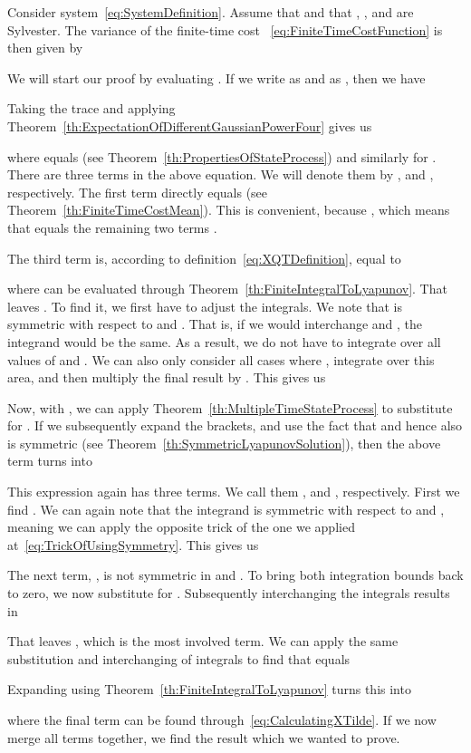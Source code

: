 \documentclass[twocolumn]{autart}
\begin{document}
\begin{thm}\label{th:FiniteTimeCostVariance}
Consider system~\eqref{eq:SystemDefinition}. Assume that  and that , ,  and  are Sylvester. The variance  of the finite-time cost ~\eqref{eq:FiniteTimeCostFunction} is then given by

\end{thm}
\begin{pf}
We will start our proof by evaluating . If we write  as  and  as , then we have

Taking the trace and applying Theorem~\ref{th:ExpectationOfDifferentGaussianPowerFour} gives us

where  equals  (see Theorem~\ref{th:PropertiesOfStateProcess}) and similarly for . There are three terms in the above equation. We will denote them by ,  and , respectively. The first term  directly equals  (see Theorem~\ref{th:FiniteTimeCostMean}). This is convenient, because , which means that  equals the remaining two terms .

The third term  is, according to definition~\eqref{eq:XQTDefinition}, equal to

where  can be evaluated through Theorem~\ref{th:FiniteIntegralToLyapunov}. That leaves . To find it, we first have to adjust the integrals. We note that  is symmetric with respect to  and . That is, if we would interchange  and , the integrand would be the same. As a result, we do not have to integrate over all values of  and . We can also only consider all cases where , integrate over this area, and then multiply the final result by . This gives us

Now, with , we can apply Theorem~\ref{th:MultipleTimeStateProcess} to substitute for . If we subsequently expand the brackets, and use the fact that  and hence also  is symmetric (see Theorem~\ref{th:SymmetricLyapunovSolution}), then the above term turns into

This expression again has three terms. We call them ,  and , respectively. First we find . We can again note that the integrand is symmetric with respect to  and , meaning we can apply the opposite trick of the one we applied at~\eqref{eq:TrickOfUsingSymmetry}. This gives us

The next term, , is not symmetric in  and . To bring both integration bounds back to zero, we now substitute  for . Subsequently interchanging the integrals results in

That leaves , which is the most involved term. We can apply the same substitution and interchanging of integrals to find that  equals

Expanding  using Theorem~\ref{th:FiniteIntegralToLyapunov} turns this into

where the final term  can be found through~\eqref{eq:CalculatingXTilde}. If we now merge all terms together, we find the result which we wanted to prove.
\end{pf}
\end{document}
